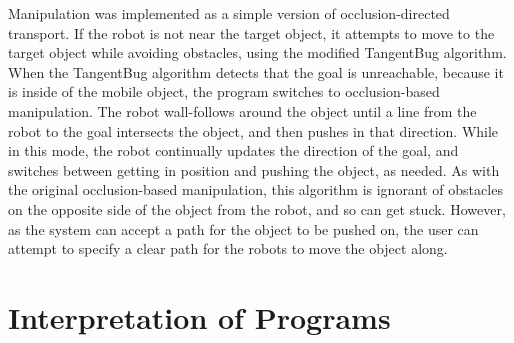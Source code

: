 Manipulation was implemented as a simple version of occlusion-directed transport. 
If the robot is not near the target object, it attempts to move to the target object while avoiding obstacles, using the modified TangentBug algorithm. 
When the TangentBug algorithm detects that the goal is unreachable, because it is inside of the mobile object, the program switches to occlusion-based manipulation. 
The robot wall-follows around the object until a line from the robot to the goal intersects the object, and then pushes in that direction. 
While in this mode, the robot continually updates the direction of the goal, and switches between getting in position and pushing the object, as needed. 
As with the original occlusion-based manipulation, this algorithm is ignorant of obstacles on the opposite side of the object from the robot, and so can get stuck. 
However, as the system can accept a path for the object to be pushed on, the user can attempt to specify a clear path for the robots to move the object along. 

\section{Interpretation of Programs}

